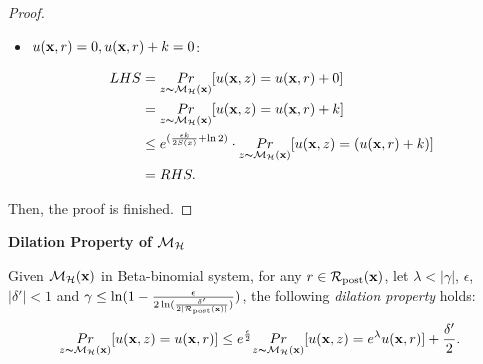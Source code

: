 \documentclass{article}
\begin{document}
\begin{proof}
\begin{itemize}
  \item {\boldmath $u(\textbf{x}, {r}) = 0, u(\textbf{x}, {r}) + k = 0$}: 

        \begin{equation*}
        \begin{split}
        LHS 
        & = \underset{z \thicksim \mathcal{M}_{\mathcal{H}}(\textbf{x})}{Pr}[u(\textbf{x}, {z}) = u(\textbf{x}, {r}) + 0]\\
        & = \underset{z \thicksim \mathcal{M}_{\mathcal{H}}(\textbf{x})}{Pr}[u(\textbf{x}, {z}) = u(\textbf{x}, {r}) + k]\\
        & \leq e^{(\frac{\epsilon k}{2 S(x)} + \ln 2)} \cdot \underset{z \thicksim \mathcal{M}_{\mathcal{H}}(\textbf{x})}{Pr}[u(\textbf{x}, {z}) = ( u(\textbf{x}, {r}) + k)]\\
        & = RHS.
        \end{split}
        \end{equation*} 

\end{itemize}
Then, the proof is finished.

\end{proof}



\noindent \textbf{Dilation Property of $\mathcal{M}_{\mathcal{H}}$}
\begin{lem}
\label{lem_dilation}
Given $\mathcal{M}_{\mathcal{H}}(\textbf{x})$ in Beta-binomial system, for any $r\in \mathcal{R}_{\textup{post}}(\textbf{x})$, let $\lambda < |\gamma|$, $\epsilon$, $|\delta'| < 1$ and $\gamma \leq \ln(1 - \frac{\epsilon}{2 \ln (\frac{\delta'}{2 |\mathcal{R}_{\textup{post}}(\textbf{x})|})})$, the following \emph{dilation property} holds:
\begin{equation*}
\underset{z \thicksim \mathcal{M}_{\mathcal{H}}(\textbf{x})}{Pr}[u(\textbf{x}, {z}) = u(\textbf{x}, {r})]
\leq
e^{\frac{\epsilon}{2}} \underset{z \thicksim \mathcal{M}_{\mathcal{H}}(\textbf{x})}{Pr}[u(\textbf{x}, {z}) = e^{\lambda} u(\textbf{x}, {r})] + \frac{\delta'}{2}.
\end{equation*}
\end{lem}
\end{document}
